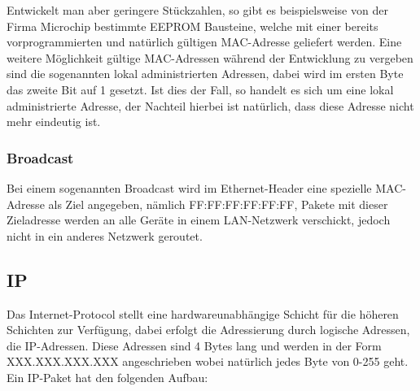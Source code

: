 \documentclass[a4paper,14pt,headsepline]{scrartcl}
\begin{document}
Entwickelt man aber geringere Stückzahlen, so gibt es beispielsweise von der Firma Microchip bestimmte EEPROM Bausteine, welche mit einer bereits vorprogrammierten und natürlich gültigen MAC-Adresse geliefert werden. Eine weitere Möglichkeit gültige MAC-Adressen während der Entwicklung zu vergeben sind die sogenannten lokal administrierten Adressen, dabei wird im ersten Byte das zweite Bit auf 1 gesetzt. Ist dies der Fall, so handelt es sich um eine lokal administrierte Adresse, der Nachteil hierbei ist natürlich, dass diese Adresse nicht mehr eindeutig ist.

\subsubsection{Broadcast}
Bei einem sogenannten Broadcast wird im Ethernet-Header eine spezielle MAC-Adresse als Ziel angegeben, nämlich FF:FF:FF:FF:FF:FF, Pakete mit dieser Zieladresse werden an alle Geräte in einem LAN-Netzwerk verschickt, jedoch nicht in ein anderes Netzwerk geroutet.

\newpage
\subsection{IP}
Das Internet-Protocol stellt eine hardwareunabhängige Schicht für die höheren Schichten zur Verfügung, dabei erfolgt die Adressierung durch logische Adressen, die IP-Adressen. Diese Adressen sind 4 Bytes lang und werden in der Form XXX.XXX.XXX.XXX angeschrieben wobei natürlich jedes Byte von 0-255 geht. Ein IP-Paket hat den folgenden Aufbau:
\begin{figure}[h]
\begin{center}
\end{center}
\end{figure}
\end{document}

